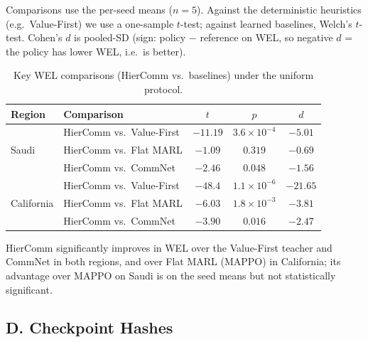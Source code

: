 \documentclass[letterpaper]{article}
\begin{document}
Comparisons use the per-seed means ($n=5$). Against the deterministic heuristics (e.g.\ Value-First) we use a one-sample $t$-test; against learned baselines, Welch's $t$-test. Cohen's $d$ is pooled-SD (sign: policy $-$ reference on WEL, so negative $d$ = the policy has lower WEL, i.e.\ is better).

\begin{table}[h]
\centering
\caption{Key WEL comparisons (HierComm vs.\ baselines) under the uniform protocol.}
\label{tab:statistics}
\begin{tabular}{llccc}
\toprule
Region & Comparison & $t$ & $p$ & $d$ \\
\midrule
\multirow{3}{*}{Saudi}
& HierComm vs.\ Value-First & $-11.19$ & $3.6\!\times\!10^{-4}$ & $-5.01$ \\
& HierComm vs.\ Flat MARL & $-1.09$ & $0.319$ & $-0.69$ \\
& HierComm vs.\ CommNet & $-2.46$ & $0.048$ & $-1.56$ \\
\midrule
\multirow{3}{*}{California}
& HierComm vs.\ Value-First & $-48.4$ & $1.1\!\times\!10^{-6}$ & $-21.65$ \\
& HierComm vs.\ Flat MARL & $-6.03$ & $1.8\!\times\!10^{-3}$ & $-3.81$ \\
& HierComm vs.\ CommNet & $-3.90$ & $0.016$ & $-2.47$ \\
\bottomrule
\end{tabular}
\end{table}

\noindent HierComm significantly improves in WEL over the Value-First teacher and CommNet in both regions, and over Flat MARL (MAPPO) in California; its advantage over MAPPO on Saudi is on the seed means but not statistically significant.

\subsection*{D. Checkpoint Hashes}
\end{document}
